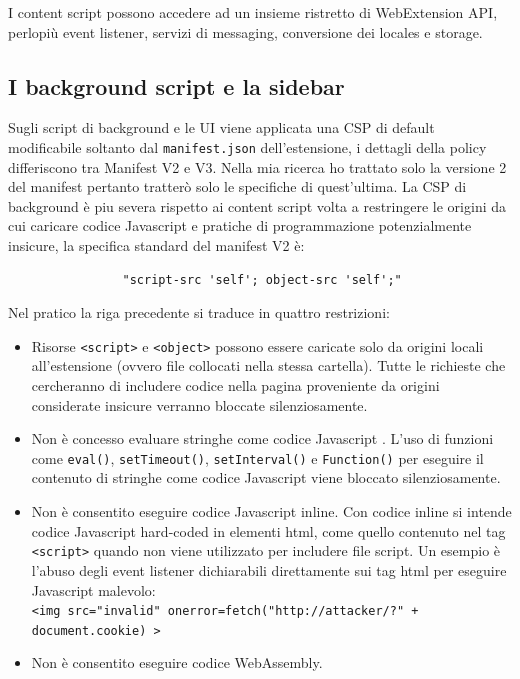 \documentclass{sapthesis}
\newcommand{\code}[1]{\texttt{#1}}
\newcommand{\JS}{Javascript }
\newcommand{\manifest}{\code{manifest.json} }
\begin{document}
            I content script possono accedere ad un insieme ristretto di WebExtension API, perlopiù event listener,
            servizi di messaging, conversione dei locales e storage.

        \subsection{I background script e la sidebar}
        \label{sec:difese-background-sidebar}
            Sugli script di background e le UI viene applicata una CSP di default modificabile soltanto dal
            \manifest dell'estensione, i dettagli della policy differiscono tra Manifest V2 e V3. Nella
            mia ricerca ho trattato solo la versione 2 del manifest pertanto tratterò solo le specifiche
            di quest'ultima.
            La CSP di background è piu severa rispetto ai content script volta a restringere le origini
            da cui caricare codice \JS e pratiche di programmazione potenzialmente insicure, la specifica
            standard del manifest V2 è:
            \begin{lstlisting}
                "script-src 'self'; object-src 'self';"
            \end{lstlisting}
            Nel pratico la riga precedente si traduce in quattro restrizioni:
            \begin{itemize}
                \item Risorse \code{<script>} e \code{<object>} possono essere caricate solo da origini
                        locali all'estensione (ovvero file collocati nella stessa cartella). Tutte le
                        richieste che cercheranno di includere codice nella pagina proveniente da origini
                        considerate insicure verranno bloccate silenziosamente.

                \item Non è concesso evaluare stringhe come codice \JS. L'uso di funzioni come
                        \code{eval()}, \code{setTimeout()}, \code{setInterval()} e \code{Function()}
                        per eseguire il contenuto di stringhe come codice \JS viene bloccato silenziosamente.
                
                \item Non è consentito eseguire codice \JS inline. Con codice inline si intende codice
                        \JS hard-coded in elementi html, come quello contenuto nel tag \code{<script>}
                        quando non viene utilizzato per includere file script. Un esempio è l'abuso degli
                        event listener dichiarabili direttamente sui tag html per eseguire \JS malevolo:\\
                        \code{<img src="invalid" onerror=fetch("http://attacker/?" + document.cookie) >}        

                \item {} Non è consentito eseguire codice WebAssembly.
            
            \end{itemize}
\end{document}
